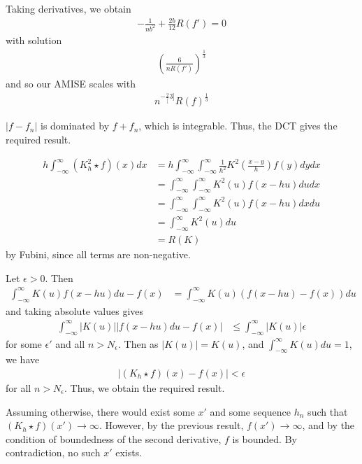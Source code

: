 \begin{exercises}
  Taking derivatives, we obtain
  \begin{align}
    \label{eq:17}
    -\frac{1}{nb^{2}} + \frac{2b}{12} R(f') = 0
  \end{align} with solution
  \begin{align}
    \label{eq:19}
    \left(\frac{6}{nR(f')} \right)^{\frac{1}{3}}
  \end{align}
  and so our AMISE scales with
  \begin{align}
    \label{eq:18}
    n^{-\frac{2}[3]} R(f)^{\frac{1}{3}}
  \end{align}
\item
  $|f - f_{n}|$ is dominated by $f + f_{n}$, which is integrable.
  Thus, the DCT gives the required result.
\item
  \begin{align}
    \label{eq:20}
    h \int_{-\infty}^{\infty} (K_{h}^{2} \star f)(x) dx &= h
    \int_{-\infty}^{\infty} \int_{-\infty}^{\infty} \frac{1}{h^{2}}
    K^{2}(\frac{x-y}{h}) f(y) dy dx \\
    &= \int_{-\infty}^{\infty} \int_{-\infty}^{\infty} K^{2}(u) f(x -
    hu) du dx \\
    &= \int_{-\infty}^{\infty} \int_{-\infty}^{\infty} K^{2}(u) f(x -
    hu) dx du \\
    &= \int_{-\infty}^{\infty} K^{2}(u) du \\
    &= R(K)
  \end{align} by Fubini, since all terms are non-negative.

  Let $\epsilon > 0$.  Then
  \begin{align}
    \label{eq:21}
    \int_{-\infty}^{\infty} K(u)f(x-hu) du - f(x) &=
    \int_{-\infty}^{\infty} K(u)(f(x - hu) - f(x)) du
  \end{align} and taking absolute values gives
  \begin{align}
    \label{eq:22}
    \int_{-\infty}^{\infty} |K(u)| |f(x-hu) du - f(x)| &\leq
    \int_{-\infty}^{\infty} |K(u)| \epsilon
  \end{align} for some $\epsilon'$ and all $n > N_{\epsilon}$. Then as
  $|K(u)| = K(u)$, and $\int_{-\infty}^{\infty} K(u) du = 1$, we have
  \begin{align}
    \label{eq:23}
    |(K_{h} \star f)(x) - f(x)| < \epsilon
  \end{align} for all $n > N_{\epsilon}$. Thus, we obtain the required
  result.

  Assuming otherwise, there would exist some $x'$ and some sequence
  $h_{n}$ such that $(K_{h} \star f)(x') \rightarrow \infty$.
  However, by the previous result, $f(x') \rightarrow \infty$, and by
  the condition of boundedness of the second derivative, $f$ is
  bounded.  By contradiction, no such $x'$ exists.


\end{exercises}
